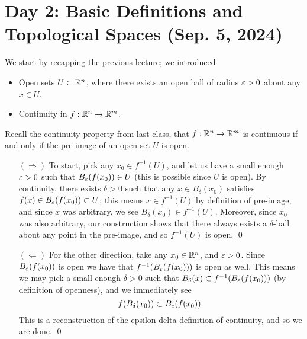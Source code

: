 \section{Day 2: Basic Definitions and Topological Spaces (Sep. 5, 2024)}
We start by recapping the previous lecture; we introduced
\begin{itemize}
    \item Open sets $U \subset \mathbb R^n$, where there exists an open ball of radius $\varepsilon > 0$ about any $x \in U$.
    \item Continuity in $f : \mathbb R^n \to \mathbb R^m$.
\end{itemize}
Recall the continuity property from last class, that $f : \mathbb R^n \to \mathbb R^m$ is continuous if and only if the pre-image of an open set $U$ is open.
\begin{enumerate}
    \item[$(\Rightarrow)$] To start, pick any $x_0 \in f^{-1}(U)$, and let us have a small enough $\varepsilon > 0$ such that $B_\varepsilon(f(x_0)) \in U$ (this is possible since $U$ is open). By continuity, there exists $\delta > 0$ such that any $x \in B_\delta(x_0)$ satisfies $f(x) \in B_\varepsilon(f(x_0)) \subset U$; this means $x \in f^{-1}(U)$ by definition of pre-image, and since $x$ was arbitrary, we see $B_\delta(x_0) \in f^{-1}(U)$. Moreover, since $x_0$ was also arbitrary, our construction shows that there always exists a $\delta$-ball about any point in the pre-image, and so $f^{-1}(U)$ is open. \qed
    \item[$(\Leftarrow)$] For the other direction, take any $x_0 \in \mathbb R^n$, and $\varepsilon > 0$. Since $B_\varepsilon(f(x_0))$ is open we have that $f^{-1}(B_\varepsilon(f(x_0)))$ is open as well. This means we may pick a small enough $\delta > 0$ such that $B_\delta(x) \subset f^{-1}(B_\varepsilon(f(x_0)))$ (by definition of openness), and we immediately see
    \[ f(B_\delta(x_0)) \subset B_\varepsilon(f(x_0)). \]
    This is a reconstruction of the epsilon-delta definition of continuity, and so we are done. \qed 
\end{enumerate}

